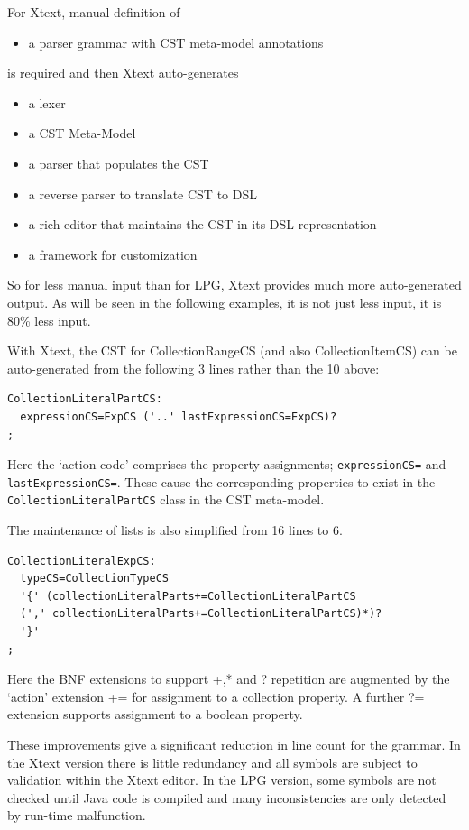 \documentclass[runningheads,a4paper]{llncs}
\begin{document}
For Xtext, manual definition of
\begin{itemize}
\item a parser grammar with CST meta-model annotations
\end{itemize}
is required and then Xtext auto-generates
\begin{itemize}
\item a lexer 
\item a CST Meta-Model
\item a parser that populates the CST
\item a reverse parser to translate CST to DSL
\item a rich editor that maintains the CST in its DSL representation
\item a framework for customization
\end{itemize}

So for less manual input than for LPG, Xtext provides much more auto-generated output. As will be seen in the following examples, it is not just less input, it is 80\% less input.

With Xtext, the CST for CollectionRangeCS (and also CollectionItemCS) can be auto-generated from the following 3 lines rather than the 10 above:

{\small\begin{verbatim}
CollectionLiteralPartCS:
  expressionCS=ExpCS ('..' lastExpressionCS=ExpCS)?
;
\end{verbatim}}

Here the `action code' comprises the property assignments; \verb#expressionCS=# and \verb#lastExpressionCS=#. These cause the corresponding properties to exist in the \verb#CollectionLiteralPartCS# class in the CST meta-model.

The maintenance of lists is also simplified from 16 lines to 6. 

{\small\begin{verbatim}
CollectionLiteralExpCS:
  typeCS=CollectionTypeCS
  '{' (collectionLiteralParts+=CollectionLiteralPartCS
  (',' collectionLiteralParts+=CollectionLiteralPartCS)*)?
  '}'
;
\end{verbatim}}

Here the BNF extensions to support +,* and ? repetition are augmented by the `action' extension += for assignment to a collection property. A further ?= extension supports assignment to a boolean property.

These improvements give a significant reduction in line count for the grammar. In the Xtext version there is little redundancy and all symbols are subject to validation within the Xtext editor. In the LPG version, some symbols are not checked until Java code is compiled and many inconsistencies are only detected by run-time malfunction.
\end{document}
